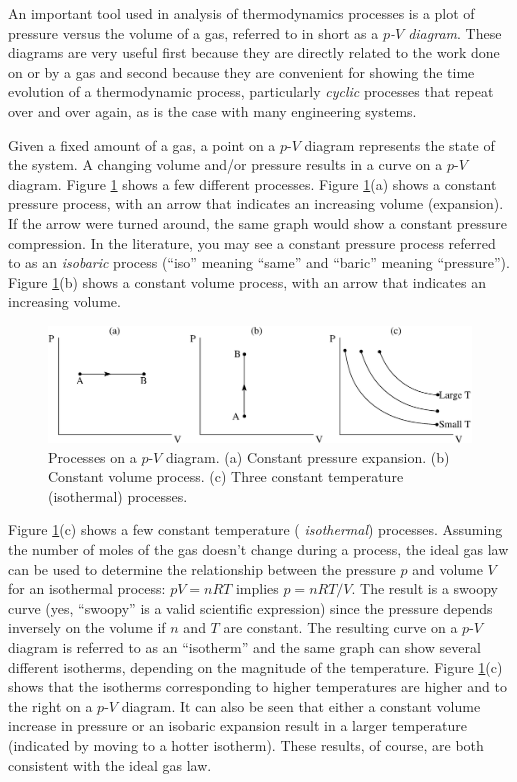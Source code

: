 An important tool used in analysis of thermodynamics processes is a
plot of pressure versus the volume of a gas, referred to in short as a
{\em $p$-$V$ diagram}. These diagrams are very useful first because
they are directly related to the work done on or by a gas and second
because they are convenient for showing the time evolution of a
thermodynamic process, particularly {\em cyclic} processes that repeat
over and over again, as is the case with many engineering systems.

Given a fixed amount of a gas, a point on a $p$-$V$ diagram represents the
state of the system.  A changing volume and/or pressure results in a
curve on a $p$-$V$ diagram.  Figure \ref{fig:PVdiagrams} shows a few
different processes.  Figure \ref{fig:PVdiagrams}(a) shows a constant
pressure process, with an arrow that indicates an increasing volume
(expansion).  If the arrow were turned around, the same graph would
show a constant pressure compression. In the literature, you may see a
constant pressure process referred to as an {\em isobaric} process
(``iso'' meaning ``same'' and ``baric'' meaning ``pressure'').  Figure
\ref{fig:PVdiagrams}(b) shows a constant volume process, with an arrow
that indicates an increasing volume.

\begin{figure}
\begin{center}
\includegraphics[width=5.0in]{gas_processes/PVdiagrams.eps}
\caption{Processes on a $p$-$V$ diagram.  (a) Constant pressure expansion.
(b) Constant volume process. (c) Three constant temperature (isothermal)
processes.}
\label{fig:PVdiagrams}
\end{center}
\end{figure}

Figure \ref{fig:PVdiagrams}(c) shows a few constant temperature ({\em
  isothermal}) processes. Assuming the number of moles of the gas
doesn't change during a process, the ideal gas law can be used to
determine the relationship between the pressure $p$ and volume $V$ for
an isothermal process: $pV = nRT$ implies $p = nRT/V$.  The result is
a swoopy curve (yes, ``swoopy'' is a valid scientific expression)
since the pressure depends inversely on the volume if $n$ and $T$ are
constant. The resulting curve on a $p$-$V$ diagram is referred to as
an ``isotherm'' and the same graph can show several different
isotherms, depending on the magnitude of the temperature.  Figure
\ref{fig:PVdiagrams}(c) shows that the isotherms corresponding to
higher temperatures are higher and to the right on a $p$-$V$
diagram. It can also be seen that either a constant volume increase in
pressure or an isobaric expansion result in a larger temperature
(indicated by moving to a hotter isotherm).  These results, of course,
are both consistent with the ideal gas law.

